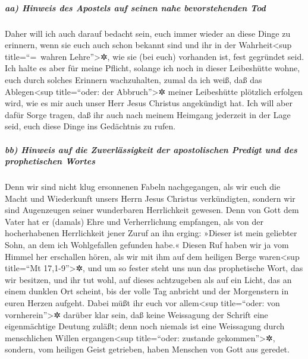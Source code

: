 \hypertarget{aa-hinweis-des-apostels-auf-seinen-nahe-bevorstehenden-tod}{%
\subparagraph{aa) Hinweis des Apostels auf seinen nahe bevorstehenden
Tod}\label{aa-hinweis-des-apostels-auf-seinen-nahe-bevorstehenden-tod}}

 Daher will ich auch darauf bedacht sein, euch immer
wieder an diese Dinge zu erinnern, wenn sie euch auch schon bekannt sind
und ihr in der Wahrheit\textless sup title=``=~wahren
Lehre''\textgreater✲, wie sie (bei euch) vorhanden ist, fest gegründet
seid.  Ich halte es aber für meine Pflicht, solange ich
noch in dieser Leibeshütte wohne, euch durch solches Erinnern
wachzuhalten,  zumal da ich weiß, daß das
Ablegen\textless sup title=``oder: der Abbruch''\textgreater✲ meiner
Leibeshütte plötzlich erfolgen wird, wie es mir auch unser Herr Jesus
Christus angekündigt hat.  Ich will aber dafür Sorge
tragen, daß ihr auch nach meinem Heimgang jederzeit in der Lage seid,
euch diese Dinge ins Gedächtnis zu rufen.

\hypertarget{bb-hinweis-auf-die-zuverluxe4ssigkeit-der-apostolischen-predigt-und-des-prophetischen-wortes}{%
\subparagraph{bb) Hinweis auf die Zuverlässigkeit der apostolischen
Predigt und des prophetischen
Wortes}\label{bb-hinweis-auf-die-zuverluxe4ssigkeit-der-apostolischen-predigt-und-des-prophetischen-wortes}}

 Denn wir sind nicht klug ersonnenen Fabeln nachgegangen,
als wir euch die Macht und Wiederkunft unsers Herrn Jesus Christus
verkündigten, sondern wir sind Augenzeugen seiner wunderbaren
Herrlichkeit gewesen.  Denn von Gott dem Vater hat er
(damals) Ehre und Verherrlichung empfangen, als von der hocherhabenen
Herrlichkeit jener Zuruf an ihn erging: »Dieser ist mein geliebter Sohn,
an dem ich Wohlgefallen gefunden habe.«  Diesen Ruf haben
wir ja vom Himmel her erschallen hören, als wir mit ihm auf dem heiligen
Berge waren\textless sup title=``Mt 17,1-9''\textgreater✲,
 und um so fester steht uns nun das prophetische Wort,
das wir besitzen, und ihr tut wohl, auf dieses achtzugeben als auf ein
Licht, das an einem dunklen Ort scheint, bis der volle Tag anbricht und
der Morgenstern in euren Herzen aufgeht.  Dabei müßt ihr
euch vor allem\textless sup title=``oder: von vornherein''\textgreater✲
darüber klar sein, daß keine Weissagung der Schrift eine eigenmächtige
Deutung zuläßt;  denn noch niemals ist eine Weissagung
durch menschlichen Willen ergangen\textless sup title=``oder: zustande
gekommen''\textgreater✲, sondern, vom heiligen Geist getrieben, haben
Menschen von Gott aus geredet.

